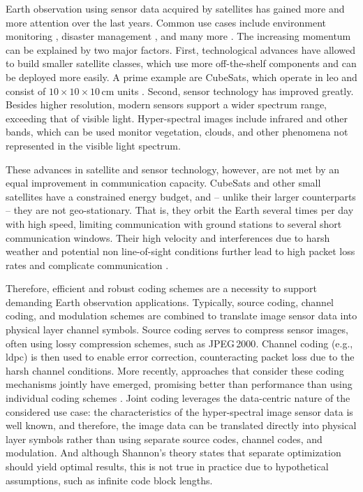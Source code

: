 \documentclass[conference]{IEEEtran}
\newcommand\jpegtwok{JPEG\,2000\xspace}
\begin{document}
Earth observation using sensor data acquired by satellites has gained more and more attention over the last years.
Common use cases include environment monitoring \cite{rs14030589}, disaster management \cite{barmpoutis2020}, and many more \cite{radix,MarCO}.
The increasing momentum can be explained by two major factors.
First, technological advances have allowed to build smaller satellite classes, which use more off-the-shelf components and can be deployed more easily.
A prime example are CubeSats, which operate in \ac{leo} and consist of $10 \times 10 \times 10$\,cm units \cite{cubesat2020}.
Second, sensor technology has improved greatly.
Besides higher resolution, modern sensors support a wider spectrum range, exceeding that of visible light.
Hyper-spectral images include infrared and other bands, which can be used monitor vegetation, clouds, and other phenomena not represented in the visible light spectrum.

These advances in satellite and sensor technology, however, are not met by an equal improvement in communication capacity.
CubeSats and other small satellites have a constrained energy budget, and -- unlike their larger counterparts -- they are not geo-stationary.
That is, they orbit the Earth several times per day with high speed, limiting communication with ground stations to several short communication windows.
Their high velocity and interferences due to harsh weather and potential non line-of-sight conditions further lead to high packet loss rates and complicate communication \cite{nogales2018}.

Therefore, efficient and robust coding schemes are a necessity to support demanding Earth observation applications.
Typically, source coding, channel coding, and modulation schemes are combined to translate image sensor data into physical layer channel symbols.
Source coding serves to compress sensor images, often using lossy compression schemes, such as \jpegtwok \cite{sentinel-2-user-handbook}.
Channel coding (e.g., \ac{ldpc}) is then used to enable error correction, counteracting packet loss due to the harsh channel conditions.
More recently, approaches that consider these coding mechanisms jointly have emerged, promising better than performance than using individual coding schemes \cite{6408177}.
Joint coding leverages the data-centric nature of the considered use case: the characteristics of the hyper-spectral image sensor data is well known, and therefore, the image data can be translated directly into physical layer symbols rather than using separate source codes, channel codes, and modulation.
And although Shannon's theory \cite{cover1991elements} states that separate optimization should yield optimal results, this is not true in practice due to hypothetical assumptions, such as infinite code block lengths.
\end{document}
